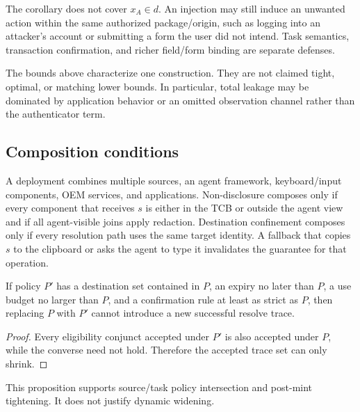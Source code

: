 \begin{remark}
The corollary does not cover $x_A\in d$. An injection may still induce an unwanted action within the same authorized package/origin, such as logging into an attacker's account or submitting a form the user did not intend. Task semantics, transaction confirmation, and richer field/form binding are separate defenses.
\end{remark}

\begin{remark}
The bounds above characterize one construction. They are not claimed tight, optimal, or matching lower bounds. In particular, total leakage may be dominated by application behavior or an omitted observation channel rather than the authenticator term.
\end{remark}

\subsection{Composition conditions}

A deployment combines multiple sources, an agent framework, keyboard/input components, OEM services, and applications. Non-disclosure composes only if every component that receives $s$ is either in the TCB or outside the agent view and if all agent-visible joins apply redaction. Destination confinement composes only if every resolution path uses the same target identity. A fallback that copies $s$ to the clipboard or asks the agent to type it invalidates the guarantee for that operation.

\begin{proposition}
If policy $P'$ has a destination set contained in $P$, an expiry no later than $P$, a use budget no larger than $P$, and a confirmation rule at least as strict as $P$, then replacing $P$ with $P'$ cannot introduce a new successful resolve trace.
\end{proposition}

\begin{proof}
Every eligibility conjunct accepted under $P'$ is also accepted under $P$, while the converse need not hold. Therefore the accepted trace set can only shrink.
\end{proof}

This proposition supports source/task policy intersection and post-mint tightening. It does not justify dynamic widening.
